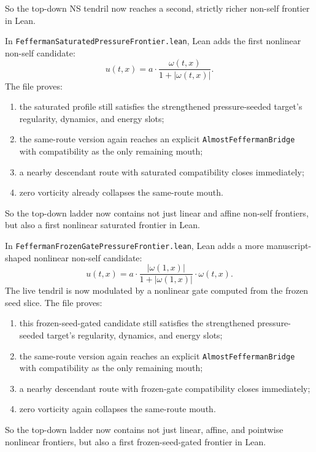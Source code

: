 \documentclass[11pt]{article}
\begin{document}
So the top-down NS tendril now reaches a second, strictly richer non-self
frontier in Lean.

In \texttt{FeffermanSaturatedPressureFrontier.lean}, Lean adds the first
nonlinear non-self candidate:
\[
u(t,x) = a \cdot \frac{\omega(t,x)}{1 + |\omega(t,x)|}.
\]
The file proves:
\begin{enumerate}[leftmargin=1.5em]
  \item the saturated profile still satisfies the strengthened pressure-seeded
  target's regularity, dynamics, and energy slots;
  \item the same-route version again reaches an explicit
  \texttt{AlmostFeffermanBridge} with compatibility as the only remaining mouth;
  \item a nearby descendant route with saturated compatibility closes
  immediately;
  \item zero vorticity already collapses the same-route mouth.
\end{enumerate}

So the top-down ladder now contains not just linear and affine non-self
frontiers, but also a first nonlinear saturated frontier in Lean.

In \texttt{FeffermanFrozenGatePressureFrontier.lean}, Lean adds a more
manuscript-shaped nonlinear non-self candidate:
\[
u(t,x) = a \cdot \frac{|\omega(1,x)|}{1 + |\omega(1,x)|} \cdot \omega(t,x).
\]
The live tendril is now modulated by a nonlinear gate computed from the frozen
seed slice.  The file proves:
\begin{enumerate}[leftmargin=1.5em]
  \item this frozen-seed-gated candidate still satisfies the strengthened
  pressure-seeded target's regularity, dynamics, and energy slots;
  \item the same-route version again reaches an explicit
  \texttt{AlmostFeffermanBridge} with compatibility as the only remaining mouth;
  \item a nearby descendant route with frozen-gate compatibility closes
  immediately;
  \item zero vorticity again collapses the same-route mouth.
\end{enumerate}

So the top-down ladder now contains not just linear, affine, and pointwise
nonlinear frontiers, but also a first frozen-seed-gated frontier in Lean.
\end{document}
